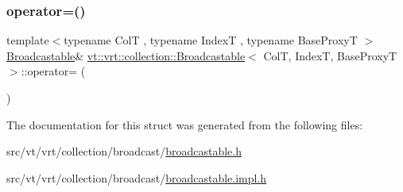 \subsubsection{\texorpdfstring{operator=()}{operator=()}}
{\footnotesize\ttfamily template$<$typename ColT , typename IndexT , typename Base\+ProxyT $>$ \\
\hyperlink{structvt_1_1vrt_1_1collection_1_1_broadcastable}{Broadcastable}\& \hyperlink{structvt_1_1vrt_1_1collection_1_1_broadcastable}{vt\+::vrt\+::collection\+::\+Broadcastable}$<$ ColT, IndexT, Base\+ProxyT $>$\+::operator= (\begin{DoxyParamCaption}\item[{\hyperlink{structvt_1_1vrt_1_1collection_1_1_broadcastable}{Broadcastable}$<$ ColT, IndexT, Base\+ProxyT $>$ const \&}]{ }\end{DoxyParamCaption})\hspace{0.3cm}{\ttfamily [default]}}



The documentation for this struct was generated from the following files\+:\begin{DoxyCompactItemize}
\item 
src/vt/vrt/collection/broadcast/\hyperlink{broadcastable_8h}{broadcastable.\+h}\item 
src/vt/vrt/collection/broadcast/\hyperlink{broadcastable_8impl_8h}{broadcastable.\+impl.\+h}\end{DoxyCompactItemize}
